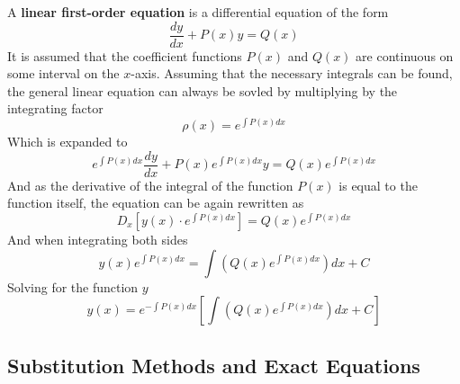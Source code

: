 \documentclass{article}
\begin{document}
\hr

A \textbf{linear first-order equation} is a differential equation of the form
$$ \frac{dy}{dx} + P(x)y = Q(x) $$
It is assumed that the coefficient functions $ P(x) $ and $ Q(x) $ are continuous on some interval on the $ x $-axis. Assuming that the necessary integrals can be found, the general linear equation can always be sovled by multiplying by the integrating factor
$$ \rho(x) = e^{\int P(x)dx} $$
Which is expanded to
$$ e^{\int P(x)dx}\frac{dy}{dx} + P(x)e^{\int P(x)dx}y = Q(x)e^{\int P(x)dx} $$
And as the derivative of the integral of the function $ P(x) $ is equal to the function itself, the equation can be again rewritten as
$$ D_x \left[ y(x) \cdot e^{\int P(x)dx} \right] = Q(x)e^{\int P(x)dx} $$
And when integrating both sides
$$ y(x)e^{\int P(x)dx} = \int \left(Q(x)e^{\int P(x)dx} \right)dx + C $$
Solving for the function $ y $
$$ y(x) = e^{-\int P(x)dx} \left[ \int \left(Q(x)e^{\int P(x)dx} \right)dx + C \right] $$

\subsection{Substitution Methods and Exact Equations}
\end{document}
